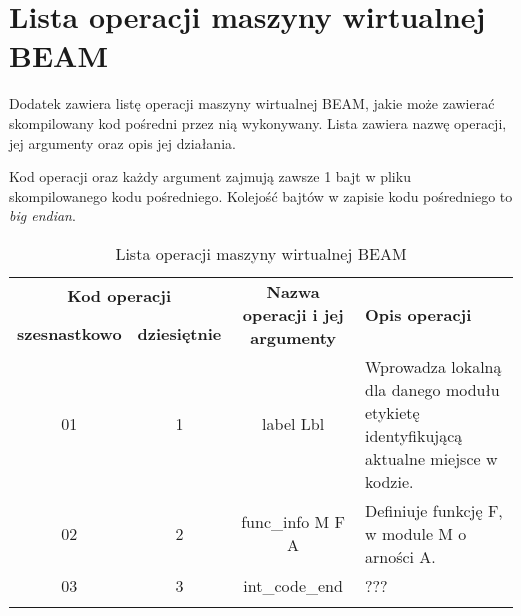 \chapter{Lista operacji maszyny wirtualnej BEAM}
\label{cha:operacjeBeam}


Dodatek zawiera listę operacji maszyny wirtualnej BEAM, jakie może zawierać skompilowany kod pośredni przez nią wykonywany.
Lista zawiera nazwę operacji, jej argumenty oraz opis jej działania.

Kod operacji oraz każdy argument zajmują zawsze 1 bajt w pliku skompilowanego kodu pośredniego.
Kolejość bajtów w zapisie kodu pośredniego to \emph{big endian}.

\begin{longtable}{|c|c|c|p{5cm}|}
\hline

\multicolumn{2}{|c|}{\textbf{Kod operacji}} & \multirow{2}{*}{\textbf{Nazwa operacji i jej argumenty}} & \multirow{2}{*}{\textbf{Opis operacji}} \\
\cline{1-2}
\textbf{szesnastkowo} & \textbf{dziesiętnie} & & \\
\hline
\endfirsthead

01 & 1 & label Lbl & Wprowadza lokalną dla danego modułu etykietę identyfikującą aktualne miejsce w kodzie. \\
\hline
02 & 2 & func\_info M F A & Definiuje funkcję F, w module M o arności A. \\
\hline
03 & 3 & int\_code\_end & ???  \\
\hline

\caption{Lista operacji maszyny wirtualnej BEAM}  \\
\end{longtable}




















